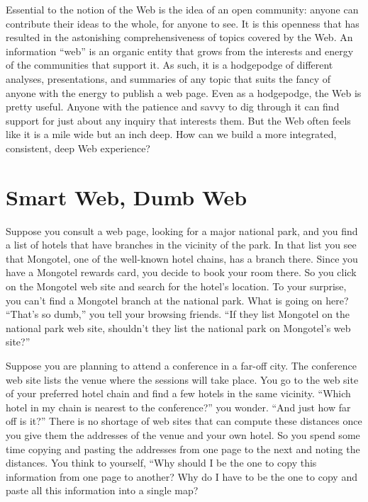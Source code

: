 Essential to the notion of the Web is the idea of an open community: anyone can contribute their ideas to the whole, for anyone to see. It is this openness that has resulted in the astonishing comprehensiveness of topics covered by the Web. An information ``web'' is an organic entity that grows from the interests and energy of the communities that support it. As such, it is a hodgepodge of different analyses, presentations, and summaries of any topic that suits the fancy of anyone with the energy to publish a web page. Even as a hodgepodge, the Web is pretty useful. Anyone with the patience and savvy to dig through it can find support for just about any inquiry that interests them. But the Web often feels like it is a mile wide but an inch deep. How can we build a more integrated, consistent, deep Web experience?


\section{Smart Web, Dumb Web}

Suppose you consult a web page, looking for a major national park, and
you find a list of hotels that have branches in the vicinity of the
park. In that list you see that Mongotel, one of the well-known hotel
chains, has a branch there. Since you have a Mongotel rewards card, you
decide to book your room there. So you click on the Mongotel web site
and search for the hotel's location. To your surprise, you can't find a
Mongotel branch at the national park. What is going on here? ``That's so
dumb,'' you tell your browsing friends. ``If they list Mongotel on the
national park web site, shouldn't they list the national park on
Mongotel's web site?''

Suppose you are planning to attend a conference in a far-off city. The
conference web site lists the venue where the sessions will take place.
You go to the web site of your preferred hotel chain and find a few
hotels in the same vicinity. ``Which hotel in my chain is nearest to the
conference?'' you wonder. ``And just how far off is it?'' There is no
shortage of web sites that can compute these distances once you give
them the addresses of the venue and your own hotel. So you spend some
time copying and pasting the addresses from one page to the next and
noting the distances. You think to yourself, ``Why should I be the one
to copy this information from one page to another? Why do I have to be
the one to copy and paste all this information into a single map?

